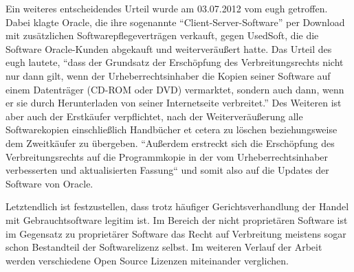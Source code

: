 Ein weiteres entscheidendes Urteil wurde am 03.07.2012 vom \gls{eugh} getroffen. Dabei klagte Oracle, die ihre sogenannte “Client-Server-Software” per Download mit zusätzlichen
Softwarepflegeverträgen verkauft, gegen UsedSoft, die die Software Oracle-Kunden abgekauft und weiterveräußert hatte. Das Urteil des \gls{eugh} lautete, “dass der Grundsatz der
Erschöpfung des Verbreitungsrechts nicht nur dann gilt, wenn der Urheberrechtsinhaber die Kopien seiner Software auf einem Datenträger (CD-ROM oder DVD) vermarktet, sondern auch dann,
wenn er sie durch Herunterladen von seiner Internetseite verbreitet.” Des Weiteren ist aber auch der Erstkäufer verpflichtet, nach der Weiterveräußerung alle Softwarekopien
einschließlich Handbücher et cetera zu löschen beziehungsweise dem Zweitkäufer zu übergeben. “Außerdem erstreckt sich die Erschöpfung des Verbreitungsrechts auf die
Programmkopie in der vom Urheberrechtsinhaber verbesserten und aktualisierten Fassung“ und somit also auf die Updates der Software von Oracle.

Letztendlich ist festzustellen, dass trotz häufiger Gerichtsverhandlung der Handel mit Gebrauchtsoftware legitim ist. Im Bereich der nicht proprietären Software
ist im Gegensatz zu proprietärer Software das Recht auf Verbreitung meistens sogar schon Bestandteil der Softwarelizenz selbst. Im weiteren Verlauf der Arbeit werden
verschiedene Open Source Lizenzen miteinander verglichen.
